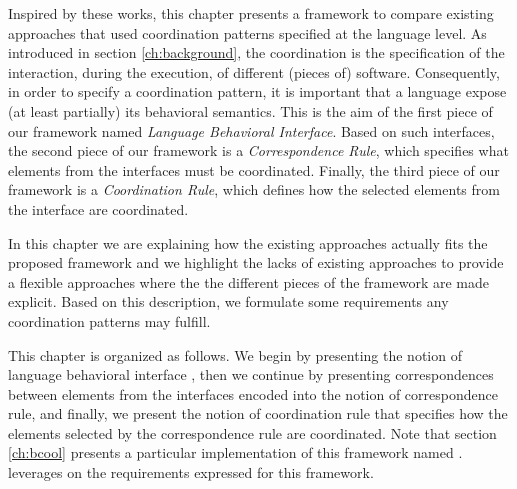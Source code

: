 Inspired by these works, this chapter presents a framework to compare existing approaches that used coordination patterns specified at the language level. As introduced in section \ref{ch:background}, the coordination is the specification of the interaction, during the execution, of different (pieces of) software. Consequently, in order to specify a coordination pattern, it is important that a language expose (at least partially) its behavioral semantics. This is the aim of the first piece of our framework named \emph{Language Behavioral Interface}. Based on such interfaces, the second piece of our framework is a \emph{Correspondence Rule}, which specifies what elements from the interfaces must be coordinated. Finally, the third piece of our framework is a \emph{Coordination Rule}, which defines how the selected elements from the interface are coordinated.


In this chapter we are explaining how the existing approaches actually fits the proposed framework and we highlight the lacks of existing approaches to provide a flexible approaches where the the different pieces of the framework are made explicit. Based on this description, we formulate some requirements any coordination patterns may fulfill.

This chapter is organized as follows. We begin by presenting the notion of language behavioral interface
, then we continue by presenting correspondences between elements from the interfaces encoded into the notion of correspondence rule, and finally, we present the notion of coordination rule that specifies how the elements selected by the correspondence rule are coordinated. 
Note that section \ref{ch:bcool} presents a particular implementation of this framework named \bcool. \bcool leverages on the requirements expressed for this framework.

